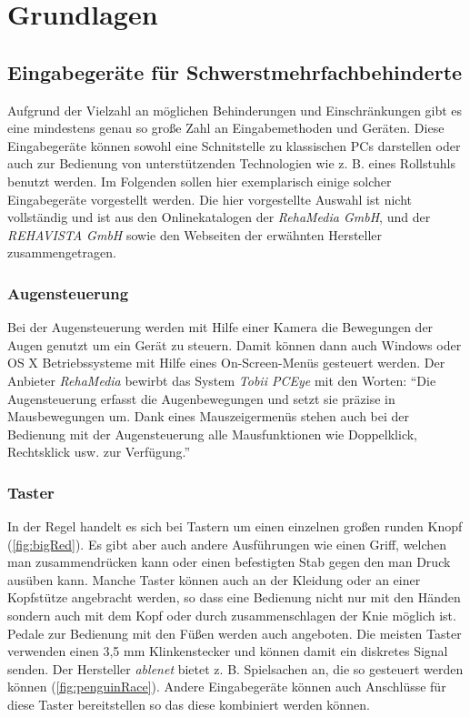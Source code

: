 \section{Grundlagen}

	\subsection{Eingabegeräte für Schwerstmehrfachbehinderte}
    \label{sec:input-devices}
    
    	Aufgrund der Vielzahl an möglichen Behinderungen und Einschränkungen gibt es eine mindestens genau so große Zahl an Eingabemethoden und Geräten. Diese Eingabegeräte können sowohl eine Schnitstelle zu klassischen PCs darstellen oder auch zur Bedienung von unterstützenden Technologien wie z. B. eines Rollstuhls benutzt werden. Im Folgenden sollen hier exemplarisch einige solcher Eingabegeräte vorgestellt werden. Die hier vorgestellte Auswahl ist nicht vollständig und ist aus den Onlinekatalogen der \emph{RehaMedia GmbH}, und der \emph{REHAVISTA GmbH} sowie den Webseiten der erwähnten Hersteller zusammengetragen.
        
        \subsubsection*{Augensteuerung}
        	Bei der Augensteuerung werden mit Hilfe einer Kamera die Bewegungen der Augen genutzt um ein Gerät zu steuern. Damit können dann auch Windows oder OS X Betriebssysteme mit Hilfe eines On-Screen-Menüs gesteuert werden. Der Anbieter \emph{RehaMedia} bewirbt das System \emph{Tobii PCEye} mit den Worten: \enquote{Die Augensteuerung erfasst die Augenbewegungen und setzt sie präzise in Mausbewegungen um. Dank eines Mauszeigermenüs stehen auch bei der Bedienung mit der Augensteuerung alle Mausfunktionen wie Doppelklick, Rechtsklick usw. zur Verfügung.} \parencite{rehamedia:TobiiPCEyeGo}
            
         \subsubsection*{Taster}
         	In der Regel handelt es sich bei Tastern um einen einzelnen großen runden Knopf (\autoref{fig:bigRed}). Es gibt aber auch andere Ausführungen wie einen Griff, welchen man zusammendrücken kann oder einen befestigten Stab gegen den man Druck ausüben kann. Manche Taster können auch an der Kleidung oder an einer Kopfstütze angebracht werden, so dass eine Bedienung nicht nur mit den Händen sondern auch mit dem Kopf oder durch zusammenschlagen der Knie möglich ist. Pedale zur Bedienung mit den Füßen werden auch angeboten. Die meisten Taster verwenden einen 3,5 mm Klinkenstecker und können damit ein diskretes Signal senden. Der Hersteller \emph{ablenet} bietet z. B. Spielsachen an, die so gesteuert werden können (\autoref{fig:penguinRace}). Andere Eingabegeräte können auch Anschlüsse für diese Taster bereitstellen so das diese kombiniert werden können.  
         	
